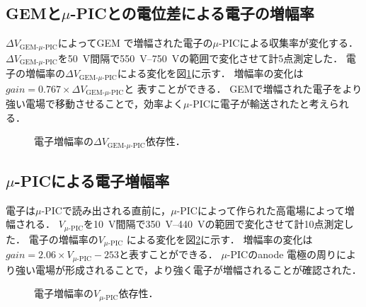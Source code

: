 \documentclass[../master]{subfiles}
\begin{document}

\subsection{GEMと$\mu$-PICとの電位差による電子の増幅率}
$\Delta V_{\text{GEM-}\mu\text{-PIC}}$によってGEM で増幅された電子の$\mu$-PICによる収集率が変化する．
$\Delta V_{\text{GEM-}\mu\text{-PIC}}$を\SI{50}{\volt}間隔で\SIrange{550}{750}{\volt}の範囲で変化させて計5点測定した．
電子の増幅率の$\Delta V_{\text{GEM-}\mu\text{-PIC}}$による変化を図\ref{fig::gain_GEM_uPIC_V_dep}に示す．
増幅率の変化は$\mathit{gain} = 0.767\times{\Delta V_{\text{GEM-}\mu\text{-PIC}}}$と
表すことができる．
GEMで増幅された電子をより強い電場で移動させることで，効率よく$\mu$-PICに電子が輸送されたと考えられる．
\begin{figure}
  \centering
  \scalebox{0.7}{}
  \caption{電子増幅率の$\Delta V_{\text{GEM-}\mu\text{-PIC}}$依存性．}
  \label{fig::gain_GEM_uPIC_V_dep}
\end{figure}

\subsection{$\mu$-PICによる電子増幅率}
電子は$\mu$-PICで読み出される直前に，$\mu$-PICによって作られた高電場によって増幅される．
$V_{\mu\text{-PIC}}$を\SI{10}{\volt}間隔で\SIrange{350}{440}{\volt}の範囲で変化させて計10点測定した．
電子の増幅率の$V_{\mu\text{-PIC}}$ による変化を図\ref{fig::gain_uPIC_V_dep}に示す．
増幅率の変化は$\mathit{gain} = 2.06\times{V_{\mu\text{-PIC}}}-253$と表すことができる．
$\mu$-PICのanode 電極の周りにより強い電場が形成されることで，より強く電子が増幅されることが確認された．
\begin{figure}
  \centering
  \scalebox{0.7}{}
  \caption{電子増幅率の$V_{\mu\text{-PIC}}$依存性．}
  \label{fig::gain_uPIC_V_dep}
\end{figure}
\end{document}
